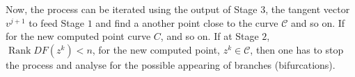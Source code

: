 \documentclass[11pt,reqno,twoside]{article}
\theoremstyle{remark}
\begin{document}
Now, the process can be iterated using the output of Stage $3$, the tangent
vector $v^{j+1}$ to feed Stage $1$ and find a another point close to the
curve  $\mathcal{C}$ and so on. If for the new computed point curve $C$,
and so on. If at Stage $2$, $\mathop{Rank} DF\left(z^{k}\right) < n$, for
the new computed point, $z^{k}\in\mathcal{C}$, then 
 one has to stop the process and analyse for the possible
appearing of branches (bifurcations).



\end{document}
